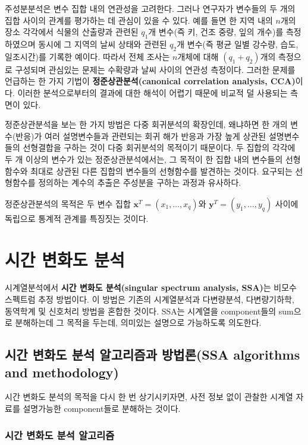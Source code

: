 \documentclass[b5paper,]{book}
\theoremstyle{definition}
\theoremstyle{definition}
\theoremstyle{definition}
\theoremstyle{remark}
\begin{document}
주성분분석은 변수 집합 내의 연관성을 고려한다. 그러나 연구자가 변수들의
두 개의 집합 사이의 관계를 평가하는 데 관심이 있을 수 있다. 예를 들면 한
지역 내의 \(n\)개의 장소 각각에서 식물의 산출량과 관련된 \(q_{1}\)개
변수(즉 키, 건조 중량, 잎의 개수)를 측정하였으며 동시에 그 지역의 날씨
상태와 관련된 \(q_{2}\)개 변수(즉 평균 일별 강수량, 습도, 일조시간)를
기록한 예이다. 따라서 전체 조사는 \(n\)개체에 대해 \((q_{1}+q_{2})\)개의
측정으로 구성되며 관심있는 문제는 수확량과 날씨 사이의 연관성 측정이다.
그러한 문제를 언급하는 한 가지 기법이 \textbf{정준상관분석(canonical
correlation analysis, CCA)}이다. 이러한 분석으로부터의 결과에 대한
해석이 어렵기 때문에 비교적 덜 사용되는 측면이 있다.

정준상관분석을 보는 한 가지 방법은 다중 회귀분석의 확장인데, 왜냐하면 한
개의 변수(반응)가 여러 설명변수들과 관련되는 회귀 해가 반응과 가장 높게
상관된 설명변수들의 선형결합을 구하는 것이 다중 회귀분석의 목적이기
때문이다. 두 집합의 각각에 두 개 이상의 변수가 있는 정준상관분석에서는,
그 목적이 한 집합 내의 변수들의 선형함수와 최대로 상관된 다른 집합의
변수들의 선형함수를 발견하는 것이다. 요구되는 선형함수를 정의하는 계수의
추출은 주성분을 구하는 과정과 유사하다.

정준상관분석의 목적은 두 변수 집합
\(\mathbf{x}^{T}=(x_{1},\ldots, x_{q})\)와
\(\mathbf{y}^{T}=(y_{1},\ldots, y_{q})\) 사이에 독립으로 통계적 관계를
특징짓는 것이다.

\chapter{시간 변화도 분석}\label{SSA}

시계열분석에서 \textbf{시간 변화도 분석(singular spectrum analysis,
SSA)}는 비모수 스펙트럼 추정 방법이다. 이 방법은 기존의 시계열분석과
다변량분석, 다변량기하학, 동역학계 및 신호처리 방법을 혼합한 것이다.
SSA는 시계열을 component들의 sum으로 분해하는데 그 목적을 두는데,
의미있는 설명으로 가능하도록 의도한다.

\section{시간 변화도 분석 알고리즘과 방법론(SSA algorithms and
methodology)}\label{----ssa-algorithms-and-methodology}

시간 변화도 분석의 목적을 다시 한 번 상기시키자면, 사전 정보 없이 관찰한
시계열 자료를 설명가능한 component들로 분해하는 것이다.

\subsection{시간 변화도 분석 알고리즘}\label{---}
\end{document}
